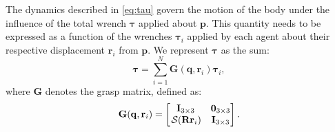 The dynamics described in \eqref{eq:tau} govern the motion of the body under the influence of the total wrench $\boldsymbol{\tau}$ applied about $\mathbf{p}$. This quantity needs to be expressed as a function of the wrenches $\boldsymbol{\tau}_i$ applied by each agent about their respective displacement $\mathbf{r}_i$ from $\mathbf{p}$. We represent $\boldsymbol{\tau}$ as the sum:
\begin{equation}
    \boldsymbol{\tau} = \sum_{i=1}^N\mathbf{G}(\mathbf{q}, \mathbf{r}_i)\boldsymbol{\tau}_i, \label{eq:tauNtauIrelation}
\end{equation}
where $\mathbf{G}$ denotes the grasp matrix, defined as:
\begin{equation}
    \mathbf{G}(\mathbf{q}, \mathbf{r}_i) = \begin{bmatrix}
        \mathbf{I}_{3\times3} & \mathbf{0}_{3\times3} \\
        \SL[\mathbf{R}\mathbf{r}_i] & \mathbf{I}_{3\times3} 
    \end{bmatrix}. \label{eq:graspmatrix}
\end{equation}

